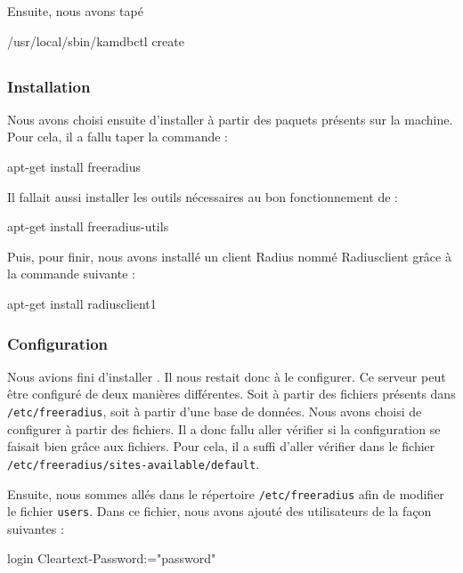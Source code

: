 Ensuite, nous avons tapé 
\begin{shellcode}
/usr/local/sbin/kamdbctl create
\end{shellcode}
\todo

\subsection{\frad}
\subsubsection{Installation}

Nous avons choisi ensuite d'installer {\frad} à partir des paquets présents sur la machine. Pour cela, il a fallu taper la commande :

\begin{shellcode}
apt-get install freeradius
\end{shellcode}

Il fallait aussi installer les outils nécessaires au bon fonctionnement de {\frad} :

\begin{shellcode}
apt-get install freeradius-utils
\end{shellcode}

Puis, pour finir, nous avons installé un client Radius nommé Radiusclient grâce à la commande suivante :

\begin{shellcode}
apt-get install radiusclient1
\end{shellcode}

\subsubsection{Configuration}
Nous avions fini d'installer {\frad}. Il nous restait donc à le configurer. Ce serveur {\rad} peut être configuré de deux manières différentes. Soit à partir des fichiers présents dans \texttt{/etc/freeradius}, soit à partir d'une base de données. Nous avons choisi de configurer à partir des fichiers. Il a donc fallu aller vérifier si la configuration se faisait bien grâce aux fichiers. Pour cela, il a suffi d'aller vérifier dans le fichier \texttt{/etc/freeradius/sites-available/default}.

Ensuite, nous sommes allés dans le répertoire \texttt{/etc/freeradius} afin de modifier le fichier \texttt{users}. Dans ce fichier, nous avons ajouté des utilisateurs de la façon suivantes :

login Cleartext-Password:="password"

